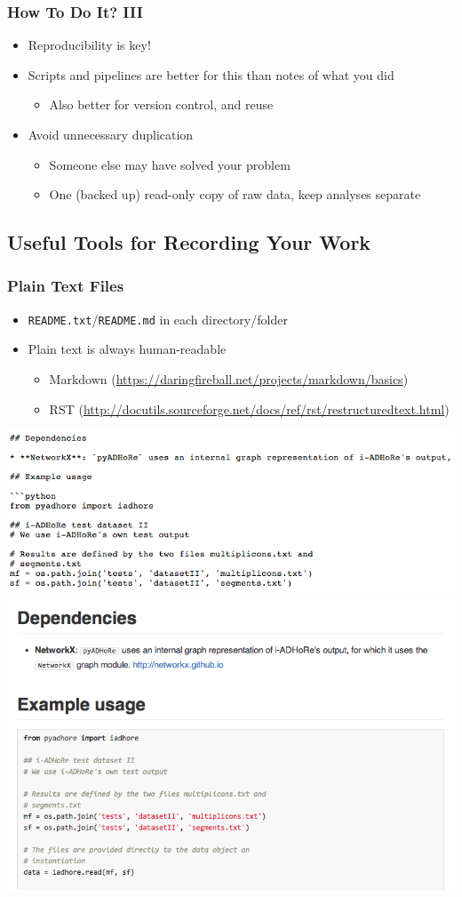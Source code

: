 \documentclass[table]{beamer}
\begin{document}
   \begin{frame}
     \frametitle{How To Do It? III}
     \begin{itemize}
	   \item Reproducibility is key!
	   \item Scripts and pipelines are better for this than notes of what you did
	   \begin{itemize}
	     \item Also better for version control, and reuse
	   \end{itemize}
	   \item Avoid unnecessary duplication
	   \begin{itemize}
	     \item Someone else may have solved your problem
	     \item One (backed up) read-only copy of raw data, keep analyses separate
	   \end{itemize}
	\end{itemize}
   \end{frame}
   
   
   \subsection{Useful Tools for Recording Your Work}
   \begin{frame}
     \frametitle{Plain Text Files}
     \begin{itemize}
       \item \texttt{README.txt}/\texttt{README.md} in each directory/folder
       \item Plain text is always human-readable
       \begin{itemize}
         \item Markdown (\url{https://daringfireball.net/projects/markdown/basics})
         \item RST (\url{http://docutils.sourceforge.net/docs/ref/rst/restructuredtext.html})
       \end{itemize}
     \end{itemize}
     \begin{center}
       \includegraphics[width=.4\textwidth]{images/markdown_before}
       \includegraphics[width=.4\textwidth]{images/markdown_after}
     \end{center}
   \end{frame}
   
\end{document}

